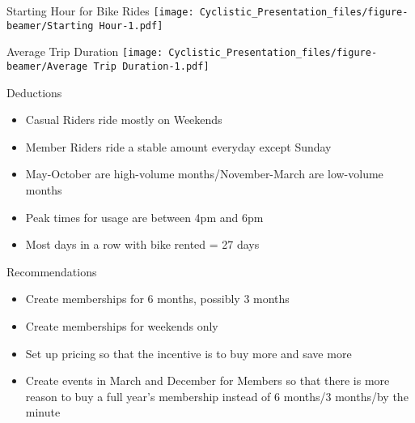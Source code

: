 \documentclass[
  ignorenonframetext,
]{beamer}
\providecommand{\tightlist}{%
  \setlength{\itemsep}{0pt}\setlength{\parskip}{0pt}}
\begin{document}
\begin{frame}{Starting Hour for Bike Rides}
\protect\hypertarget{starting-hour-for-bike-rides}{}
\texttt{[image: Cyclistic\_Presentation\_files/figure-beamer/Starting Hour-1.pdf]}
\end{frame}

\begin{frame}{Average Trip Duration}
\protect\hypertarget{average-trip-duration}{}
\texttt{[image: Cyclistic\_Presentation\_files/figure-beamer/Average Trip Duration-1.pdf]}
\end{frame}

\begin{frame}{Deductions}
\protect\hypertarget{deductions}{}
\begin{itemize}
\tightlist
\item
  Casual Riders ride mostly on Weekends
\item
  Member Riders ride a stable amount everyday except Sunday
\item
  May-October are high-volume months/November-March are low-volume
  months
\item
  Peak times for usage are between 4pm and 6pm
\item
  Most days in a row with bike rented = 27 days
\end{itemize}
\end{frame}

\begin{frame}{Recommendations}
\protect\hypertarget{recommendations}{}
\begin{itemize}
\tightlist
\item
  Create memberships for 6 months, possibly 3 months
\item
  Create memberships for weekends only
\item
  Set up pricing so that the incentive is to buy more and save more
\item
  Create events in March and December for Members so that there is more
  reason to buy a full year's membership instead of 6 months/3 months/by
  the minute
\end{itemize}
\end{frame}
\end{document}
